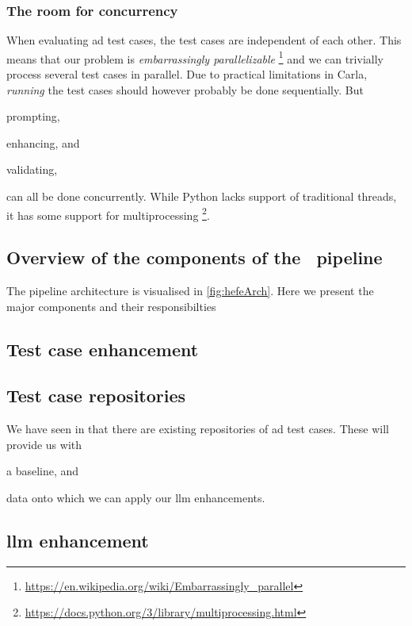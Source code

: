 \subsubsection*{The room for concurrency}

When evaluating \acrshort{ad} test cases, the test cases are independent of each
other. This means that our problem is \textit{embarrassingly parallelizable}
\footnote{\url{https://en.wikipedia.org/wiki/Embarrassingly_parallel}} and we can
trivially process several test cases in parallel. Due to practical limitations
in Carla, \textit{running} the test cases should however probably be done
sequentially. But \begin{inparaenum}
    \item prompting,
    \item enhancing, and
    \item validating,
\end{inparaenum}
can all be done concurrently. While Python lacks support of traditional threads,
it has some support for multiprocessing
\footnote{\url{https://docs.python.org/3/library/multiprocessing.html}}.

\subsection*{Overview of the components of the \hefe~pipeline}

The pipeline architecture is visualised in \cref{fig:hefeArch}. Here we
present the major components and their responsibilties


\subsection*{Test case enhancement}

\subsection{Test case repositories}

We have seen in  that there are existing repositories of
\acrshort{ad} test cases. These will provide us with \begin{inparaenum}
    \item a baseline,
    and
    \item data onto which we can apply our \acrshort{llm} enhancements.
\end{inparaenum}

\subsection{\acrshort{llm} enhancement}\label{sec:llmEnhancement}

